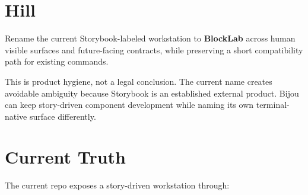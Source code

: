 \section{Hill}\label{record-134-hill}

Rename the current Storybook-labeled workstation to \textbf{BlockLab} across human visible surfaces and future-facing contracts, while preserving a short compatibility path for existing commands.

This is product hygiene, not a legal conclusion. The current name creates avoidable ambiguity because Storybook is an established external product. Bijou can keep story-driven component development while naming its own terminal-native surface differently.

\section{Current Truth}\label{record-134-current-truth}

The current repo exposes a story-driven workstation through:

